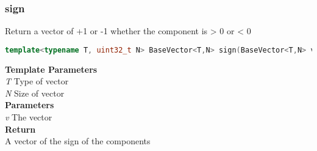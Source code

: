\subsubsection{sign}
\begin{mdframed}
Return a vector of +1 or -1 whether the component is > 0 or < 0
\begin{lstlisting}[language=C++]
template<typename T, uint32_t N> BaseVector<T,N> sign(BaseVector<T,N> v) 
\end{lstlisting}
\textbf{Template Parameters} \\ 
\textit{T} Type of vector \\ 
\textit{N} Size of vector \\ 
\textbf{Parameters} \\ 
\textit{v} The vector \\ 
\textbf{Return} \\ 
A vector of the sign of the components\\ 
\end{mdframed}

